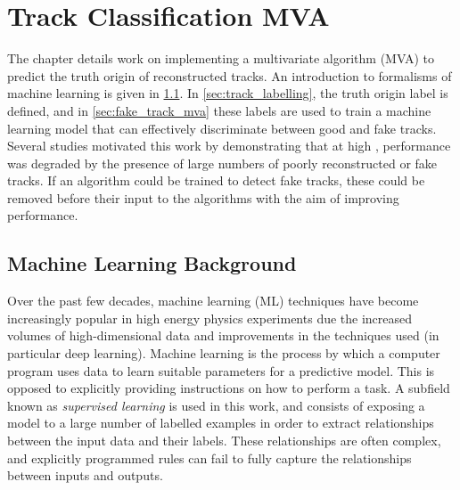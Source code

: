 \chapter{Track Classification MVA}\label{chap:track_classification_mva}

The chapter details work on implementing a multivariate algorithm (MVA) to predict the truth origin of reconstructed tracks.
An introduction to formalisms of machine learning is given in \cref{sec:ml_background}.
In \cref{sec:track_labelling}, the truth origin label is defined, and in \cref{sec:fake_track_mva} these labels are used to train a machine learning model that can effectively discriminate between good and fake tracks.
Several studies motivated this work by demonstrating that at high \pt, \btagging performance was degraded by the presence of large numbers of poorly reconstructed or fake tracks.
If an algorithm could be trained to detect fake tracks, these could be removed before their input to the \btagging algorithms with the aim of improving performance.


\section{Machine Learning Background}\label{sec:ml_background}

Over the past few decades, machine learning (ML) techniques have become increasingly popular in high energy physics experiments due the increased volumes of high-dimensional data and improvements in the techniques used (in particular deep learning).
Machine learning is the process by which a computer program uses data to learn suitable parameters for a predictive model.
This is opposed to explicitly providing instructions on how to perform a task.
A subfield known as \textit{supervised learning} is used in this work, and consists of exposing a model to a large number of labelled examples in order to extract relationships between the input data and their labels.
These relationships are often complex, and explicitly programmed rules can fail to fully capture the relationships between inputs and outputs.


